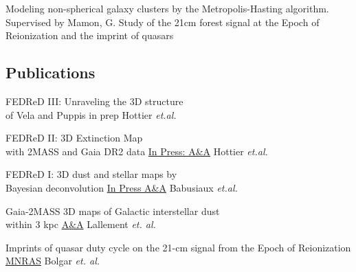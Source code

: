 \documentclass[
 a4paper, 9.5pt,
  sidebarwidth=0.3\paperwidth,
]{fortysecondscv}
\begin{document}
\makefrontsidebar

\begin{cvtable}
  {Modeling non-spherical galaxy clusters by the Metropolis-Hasting algorithm. Supervised by
  Mamon, G.}
  {Study of the 21cm forest signal at the Epoch of Reionization and the imprint of quasars}
\end{cvtable}


\begin{cvtable}
\end{cvtable}

\subsection{Publications}
\begin{cvtable}
  {FEDReD III: Unraveling the 3D structure \\of Vela and Puppis}
  {in prep}
  {Hottier \textit{et.al.}}

  {FEDReD II: 3D Extinction Map\\ with 2MASS and Gaia DR2 data}
  {\href{https://ui.adsabs.harvard.edu/abs/2020arXiv200703734H/abstract}{In Press: A\&A}}
  {Hottier \textit{et.al.}}

  {FEDReD I: 3D dust and stellar maps by \\Bayesian deconvolution}
  {\href{https://ui.adsabs.harvard.edu/abs/2020arXiv200704455B/abstract}{In Press A\&A}}
  {Babusiaux \textit{et.al.}}

  {Gaia-2MASS 3D maps of Galactic interstellar dust\\within 3 kpc}
  {\href{https://ui.adsabs.harvard.edu/\#abs/2019arXiv190204116L/abstract}{A\&A}}
  {Lallement \textit{et. al.}}

  {Imprints of quasar duty cycle on the 21-cm signal from the Epoch of Reionization}
  {\href{https://ui.adsabs.harvard.edu/\#abs/2019arXiv190204116L/abstract}{MNRAS}}
  {Bolgar \textit{et. al.}}
\end{cvtable}
\end{document}
